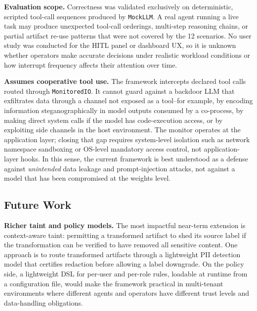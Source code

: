 \documentclass{article} %
\theoremstyle{plain}
\theoremstyle{definition}
\theoremstyle{remark}
\begin{document}
\vspace{-0.3em}
\textbf{Evaluation scope.} Correctness was validated exclusively on
deterministic, scripted tool-call sequences produced by \texttt{MockLLM}.
A real agent running a live task may produce unexpected tool-call orderings,
multi-step reasoning chains, or partial artifact re-use patterns that were
not covered by the 12 scenarios. No user study was conducted for the HITL
panel or dashboard UX, so it is unknown whether operators make accurate
decisions under realistic workload conditions or how interrupt frequency
affects their attention over time.

\vspace{-0.3em}
\textbf{Assumes cooperative tool use.} The framework intercepts declared
tool calls routed through \texttt{MonitoredIO}. It cannot guard against
a backdoor LLM that exfiltrates data through a channel not exposed as a
tool--for example, by encoding information steganographically in model
outputs consumed by a co-process, by making direct system calls if the
model has code-execution access, or by exploiting side channels in the
host environment. The monitor operates at the application layer; closing
that gap requires system-level isolation such as network namespace
sandboxing or OS-level mandatory access control, not application-layer
hooks. In this sense, the current framework is best understood as a defense
against \emph{unintended} data leakage and prompt-injection attacks, not
against a model that has been compromised at the weights level.

\vspace{-1em}
\subsection{Future Work}
\vspace{-0.5em}

\textbf{Richer taint and policy models.} The most impactful near-term
extension is context-aware taint: permitting a transformed artifact to shed
its source label if the transformation can be verified to have removed all
sensitive content. One approach is to route transformed artifacts through a
lightweight PII detection model that certifies redaction before allowing a
label downgrade. On the policy side, a lightweight DSL for per-user and
per-role rules, loadable at runtime from a configuration file, would make
the framework practical in multi-tenant environments where different agents
and operators have different trust levels and data-handling obligations.
\end{document}
